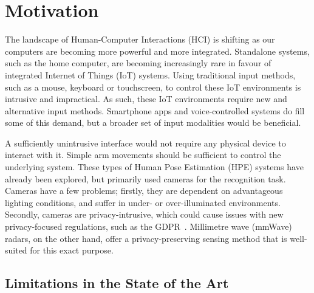 \section{Motivation}
\label{section: introduction - motivation}


The landscape of Human-Computer Interactions (HCI) is shifting as our computers are becoming more powerful and more integrated.
Standalone systems, such as the home computer, are becoming increasingly rare in favour of integrated Internet of Things (IoT) systems.
Using traditional input methods, such as a mouse, keyboard or touchscreen, to control these IoT environments is intrusive and impractical.
As such, these IoT environments require new and alternative input methods.
Smartphone apps and voice-controlled systems do fill some of this demand, but a broader set of input modalities would be beneficial.

A sufficiently unintrusive interface would not require any physical device to interact with it.
Simple arm movements should be sufficient to control the underlying system.
These types of Human Pose Estimation (HPE) systems have already been explored, but primarily used cameras for the recognition task.
Cameras have a few problems; firstly, they are dependent on advantageous lighting conditions, and suffer in under- or over-illuminated environments.
Secondly, cameras are privacy-intrusive, which could cause issues with new privacy-focused regulations, such as the GDPR~\cite{GDPR}.
Millimetre wave (mmWave) radars, on the other hand, offer a privacy-preserving sensing method that is well-suited for this exact purpose.


\subsection*{Limitations in the State of the Art}



